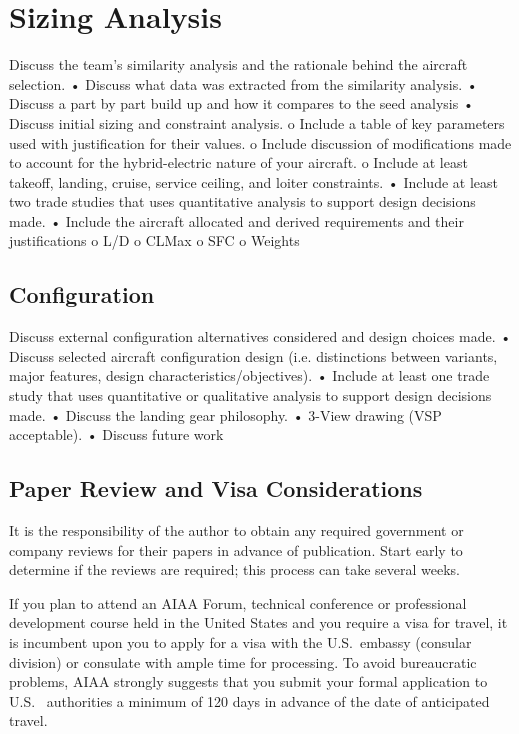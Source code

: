 \documentclass[conf]{new-aiaa}
\begin{document}
\section{Sizing Analysis}

Discuss the team’s similarity analysis and the rationale behind the aircraft
selection.
• Discuss what data was extracted from the similarity analysis.
• Discuss a part by part build up and how it compares to the seed analysis
• Discuss initial sizing and constraint analysis.
o Include a table of key parameters used with justification for their values.
o Include discussion of modifications made to account for the hybrid-electric
nature of your aircraft.
o Include at least takeoff, landing, cruise, service ceiling, and loiter
constraints.
• Include at least two trade studies that uses quantitative analysis to support design
decisions made.
• Include the aircraft allocated and derived requirements and their justifications
o L/D
o CLMax
o SFC
o Weights

\subsection{Configuration}
Discuss external configuration alternatives considered and design choices made.
• Discuss selected aircraft configuration design (i.e. distinctions between variants,
major features, design characteristics/objectives).
• Include at least one trade study that uses quantitative or qualitative analysis to
support design decisions made.
• Discuss the landing gear philosophy.
• 3-View drawing (VSP acceptable).
• Discuss future work

\subsection{Paper Review and Visa Considerations}

It is the responsibility of the author to obtain any required government or company reviews for their papers in advance of publication. Start early to determine if the reviews are required; this process can take several weeks.

If you plan to attend an AIAA Forum, technical conference or professional development course held in the United States and you require a visa for travel, it is incumbent upon you to apply for a visa with the U.S.~embassy (consular division) or consulate with ample time for processing.  To avoid bureaucratic problems, AIAA strongly suggests that you submit your formal application to U.S.~ authorities a minimum of 120 days in advance of the date of anticipated travel.
\end{document}
